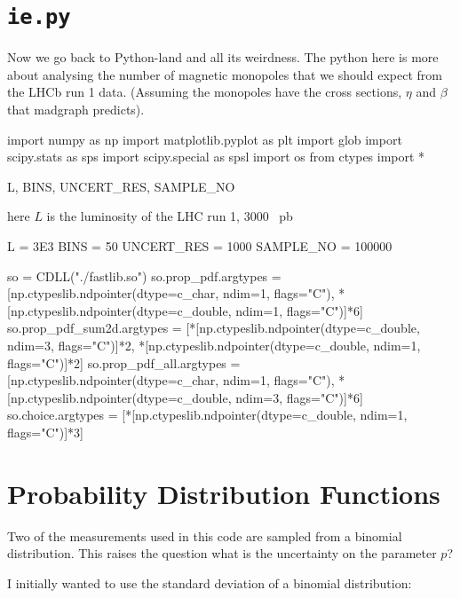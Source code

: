 \documentclass[10pt, a4paper]{article}
\begin{document}
\section{\texttt{ie.py}}

Now we go back to Python-land and all its weirdness. The python here is more about analysing the number of magnetic monopoles that we should expect from the LHCb run 1 data. (Assuming the monopoles have the cross sections, $\eta$ and $\beta$ that madgraph predicts).


\begin{code}
import numpy as np
import matplotlib.pyplot as plt
import glob
import scipy.stats as sps
import scipy.special as spsl
import os 
from ctypes import *
\end{code}

\begin{codevar}{L, BINS, UNCERT_RES, SAMPLE_NO}

here $L$ is the luminosity of the LHC run 1, $3000$ \si{\per\pico\barn}

\begin{code}
L = 3E3
BINS = 50
UNCERT_RES = 1000
SAMPLE_NO = 100000
\end{code}
\end{codevar}

\begin{code}
so = CDLL("./fastlib.so")
so.prop_pdf.argtypes       =   [np.ctypeslib.ndpointer(dtype=c_char,   ndim=1, flags="C"), 
                              *[np.ctypeslib.ndpointer(dtype=c_double, ndim=1, flags="C")]*6]
so.prop_pdf_sum2d.argtypes = [*[np.ctypeslib.ndpointer(dtype=c_double, ndim=3, flags="C")]*2, 
                              *[np.ctypeslib.ndpointer(dtype=c_double, ndim=1, flags="C")]*2]
so.prop_pdf_all.argtypes   =   [np.ctypeslib.ndpointer(dtype=c_char,   ndim=1, flags="C"), 
                              *[np.ctypeslib.ndpointer(dtype=c_double, ndim=3, flags="C")]*6]
so.choice.argtypes         = [*[np.ctypeslib.ndpointer(dtype=c_double, ndim=1, flags="C")]*3]
\end{code}

\section{Probability Distribution Functions}

Two of the measurements used in this code are sampled from a binomial distribution. This raises the question what is the uncertainty on the parameter $p$?

I initially wanted to use the standard deviation of a binomial distribution:
\end{document}
